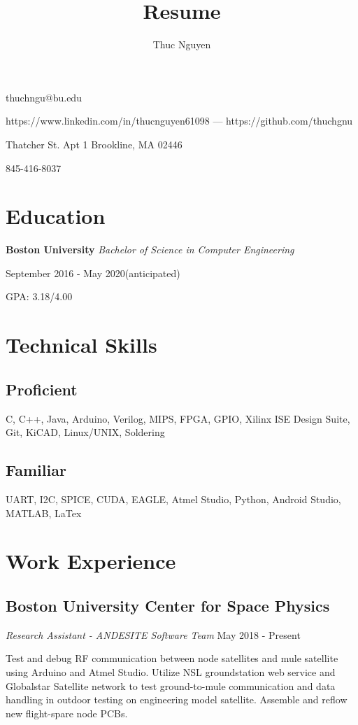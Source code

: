 \documentclass{article}
\makeatletter
\renewcommand{\maketitle}
{\begin{center}
{\huge\bfseries\theauthor}
\vspace{.5em}

thuchngu@bu.edu

https://www.linkedin.com/in/thucnguyen61098 --- https://github.com/thuchgnu

\end{center}}
\makeatother
\begin{document}
\title{Resume}
\author{Thuc Nguyen}
\maketitle
\vspace{-.5em}
{ Thatcher St. Apt 1 Brookline, MA 02446

845-416-8037

}
\vspace{-1.5em}
\section{Education}
\textbf{Boston University}  \textit{Bachelor of Science in Computer Engineering}

September 2016 - May 2020(anticipated)

GPA: 3.18/4.00

\vspace{-.75em}
\section{Technical Skills}
\subsection{Proficient}
C, C++, Java, Arduino, Verilog, MIPS, FPGA, GPIO, Xilinx ISE Design Suite, Git, KiCAD, Linux/UNIX, Soldering
\vspace{-.75em}
\subsection{Familiar}
UART, I2C, SPICE, CUDA, EAGLE, Atmel Studio, Python, Android Studio, MATLAB, LaTex

\vspace{-.75em}
\section{Work Experience}
\subsection{Boston University Center for Space Physics}  \textit{Research Assistant - ANDESITE Software Team}
  May 2018 - Present

Test and debug RF communication between node satellites and mule satellite using Arduino and Atmel Studio. Utilize NSL groundstation web service and Globalstar Satellite network to test ground-to-mule communication and data handling in outdoor testing on engineering model satellite. Assemble and reflow new flight-spare node PCBs.
\vspace{-.75em}
\end{document}
